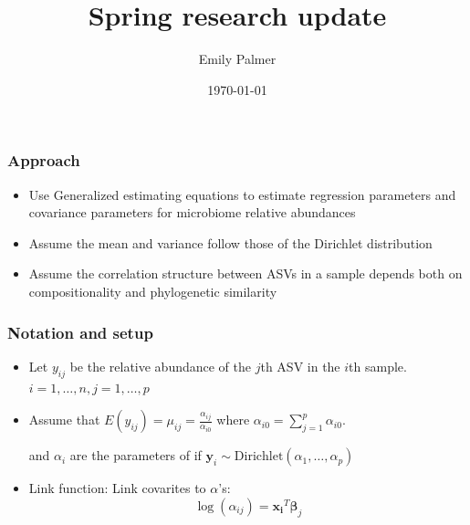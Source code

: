 \documentclass{beamer}
\title[Research Update]{Spring research update} %
\author{Emily Palmer} %
\institute[OSU] %
  {Oregon State University \\ %
    \medskip
    \textit{palmerem@oregonstate.edu} %
  }
\date{\today} %
\begin{document}
  \begin{frame}
  \titlepage %
  \end{frame}



\begin{frame}
\frametitle{Approach}
\begin{itemize}
  \item Use Generalized estimating equations to estimate regression parameters and covariance parameters for microbiome relative abundances
  \item Assume the mean and variance follow those of the Dirichlet distribution
  \item Assume the correlation structure between ASVs in a sample depends both on compositionality and phylogenetic similarity
\end{itemize}
\end{frame}

\begin{frame}
\frametitle{Notation and setup}
\begin{itemize}
  \item Let $y_{ij}$ be the relative abundance of the $j$th ASV in the $i$th sample. $i = 1, \ldots , n, j = 1, \ldots , p$
  \item Assume that $E(y_{ij})  = \mu_{ij} = \frac{\alpha_{ij}}{\alpha_{i0}}$
  where $\alpha_{i0} = \sum_{j = 1}^p \alpha_{i0}$.

  and $\alpha_i$ are the parameters of if
  $\mathbf{y}_i \sim \text{Dirichlet}(\alpha_1, \ldots , \alpha_p)$

  \item Link function: Link covarites to $\alpha$'s:
  $$\log(\alpha_{ij}) = \mathbf{x_i}^T\boldsymbol\beta_j$$
\end{itemize}
\end{frame}
\end{document}
